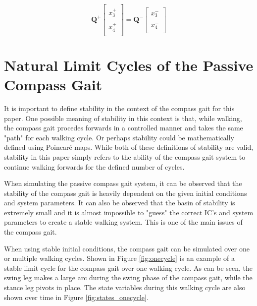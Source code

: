 \documentclass{./springer/svjour3}
\newcommand{\mb}[1]{\mathbf{#1}}
\begin{document}
\begin{equation}
\label{eq:trans2}
\mb{Q^+}
\begin{bmatrix}
\\x_3^+\\
\\x_4^+\\
\end{bmatrix}
 = 
\mb{Q^-}
\begin{bmatrix}
\\x_3^-\\
\\x_4^-\\
\end{bmatrix}
\end{equation}




\section{Natural Limit Cycles of the Passive Compass Gait}

It is important to define stability in the context of the compass gait for this paper. One possible meaning of stability in this context is that, while walking, 
the compass gait procedes forwards in a controlled manner and takes the same "path" for each walking cycle. Or perhaps stability could be mathematically defined
using Poincaré maps. While both of these definitions of stability are valid, stability in this paper simply refers to the ability of the compass gait system to 
continue walking forwards for the defined number of cycles.

When simulating the passive compass gait system, it can be observed that the stability of the compass gait is heavily dependent on the
given initial conditions and system parameters. It can also be observed that the basin of stability is extremely small and it is almost impossible
to "guess" the correct IC's and system parameters to create a stable walking system. This is one of the main issues of the compass gait.

When using stable initial conditions, the compass gait can be simulated over one or multiple walking cycles. Shown in Figure \ref{fig:onecycle}
is an example of a stable limit cycle for the compass gait over one walking cycle. As can be seen, the swing leg makes a large arc during the swing phase of the 
compass gait, while the stance leg pivots in place. The state variables during this walking cycle are also shown over time in Figure \ref{fig:states_onecycle}.
\end{document}
